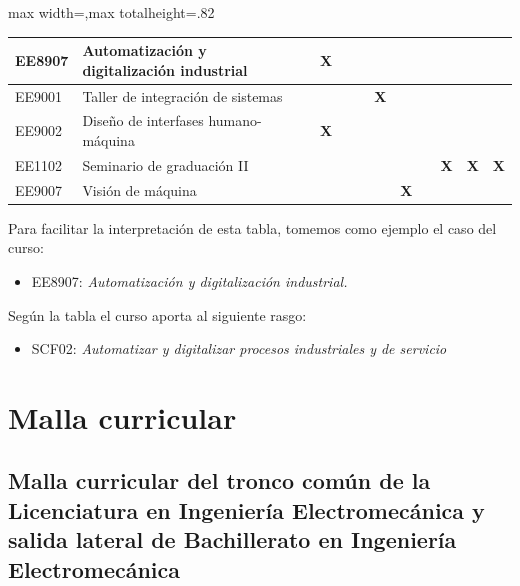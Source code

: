 \begin{center}
\begin{adjustbox}{max width=\textwidth,max totalheight=.82\textheight}
\begin{tabular}{|l|p{4.6cm}|c|c|c|c|c|c|c|c|c|c|}
EE8907 & Automatización y digitalización industrial & \textbf{ } & \textbf{X} & \textbf{ } & \textbf{ } & \textbf{ } & \textbf{ } & \textbf{ } & \textbf{ } & \textbf{ } & \textbf{ } \\ \hline
\rowcolor{azulTabla}
EE9001 & Taller de integración de sistemas & \textbf{ } & \textbf{ } & \textbf{ } & \textbf{ } & \textbf{X} & \textbf{ } & \textbf{ } & \textbf{ } & \textbf{ } & \textbf{ } \\ \hline
EE9002 & Diseño de interfases humano-máquina & \textbf{ } & \textbf{X} & \textbf{ } & \textbf{ } & \textbf{ } & \textbf{ } & \textbf{ } & \textbf{ } & \textbf{ } & \textbf{ } \\ \hline
\rowcolor{azulTabla}
EE1102 & Seminario de graduación II & \textbf{ } & \textbf{ } & \textbf{ } & \textbf{ } & \textbf{ } & \textbf{ } & \textbf{ } & \textbf{X} & \textbf{X} & \textbf{X} \\ \hline
EE9007 & Visión de máquina & \textbf{ } & \textbf{ } & \textbf{ } & \textbf{ } & \textbf{ } & \textbf{X} & \textbf{ } & \textbf{ } & \textbf{ } & \textbf{ } \\ \hline
\end{tabular}
\end{adjustbox}
\end{center}

Para facilitar la interpretación de esta tabla, tomemos como ejemplo el caso del curso:\par

\begin{itemize}
\item EE8907: \textit{Automatización y digitalización industrial}\textit{.}
\end{itemize}
Según la tabla el curso aporta al siguiente rasgo:\par

\begin{itemize}
\item SCF02: \textit{Automatizar y digitalizar procesos industriales y de servicio}
\end{itemize}
\section*{Malla curricular}

\subsection*{Malla curricular del tronco común de la Licenciatura en Ingeniería Electromecánica y salida lateral de Bachillerato en Ingeniería Electromecánica}

